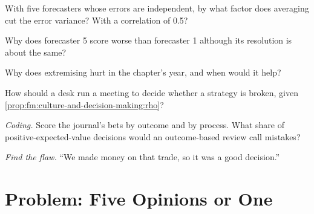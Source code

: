 \begin{exercise}[$\star$]\label{exo:fm:culture-and-decision-making:3}
With five forecasters whose errors are independent, by what factor does averaging cut the error variance? With a correlation of 0.5?
\end{exercise}

\begin{exercise}[$\star\star$]\label{exo:fm:culture-and-decision-making:4}
Why does forecaster 5 score worse than forecaster 1 although its resolution is about the same?
\end{exercise}

\begin{exercise}[$\star\star$]\label{exo:fm:culture-and-decision-making:5}
Why does extremising hurt in the chapter's year, and when would it help?
\end{exercise}

\begin{exercise}[$\star\star$]\label{exo:fm:culture-and-decision-making:6}
How should a desk run a meeting to decide whether a strategy is broken, given \cref{prop:fm:culture-and-decision-making:rho}?
\end{exercise}

\begin{exercise}[$\star\star\star$]\label{exo:fm:culture-and-decision-making:7}
\emph{Coding.} Score the journal's bets by outcome and by process. What share of positive-expected-value decisions would an outcome-based review call
mistakes?
\end{exercise}

\begin{exercise}[$\star\star\star$]\label{exo:fm:culture-and-decision-making:8}
\emph{Find the flaw.} ``We made money on that trade, so it was a good decision.''
\end{exercise}

\section{Problem: Five Opinions or One}

